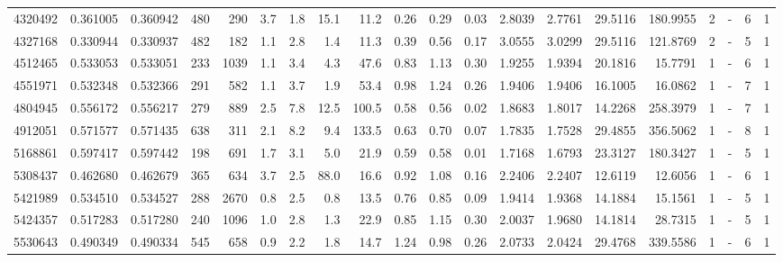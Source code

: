 \begin{center}
\begin{tabular}{rccrrccrrrrrrrrrrlrr}
   4320492 & 0.361005 & 0.360942 &  480 &  290 &      3.7 &      1.8 &    15.1 &    11.2 &   0.26 &   0.29 &       0.03 &  2.8039 &  2.7761 &   29.5116 &  180.9955 &       2 &             - &        6 &         1 \\
   4327168 & 0.330944 & 0.330937 &  482 &  182 &      1.1 &      2.8 &     1.4 &    11.3 &   0.39 &   0.56 &       0.17 &  3.0555 &  3.0299 &   29.5116 &  121.8769 &       2 &             - &        5 &         1 \\
   4512465 & 0.533053 & 0.533051 &  233 & 1039 &      1.1 &      3.4 &     4.3 &    47.6 &   0.83 &   1.13 &       0.30 &  1.9255 &  1.9394 &   20.1816 &   15.7791 &       1 &             - &        6 &         1 \\
   4551971 & 0.532348 & 0.532366 &  291 &  582 &      1.1 &      3.7 &     1.9 &    53.4 &   0.98 &   1.24 &       0.26 &  1.9406 &  1.9406 &   16.1005 &   16.0862 &       1 &             - &        7 &         1 \\
   4804945 & 0.556172 & 0.556217 &  279 &  889 &      2.5 &      7.8 &    12.5 &   100.5 &   0.58 &   0.56 &       0.02 &  1.8683 &  1.8017 &   14.2268 &  258.3979 &       1 &             - &        7 &         1 \\
   4912051 & 0.571577 & 0.571435 &  638 &  311 &      2.1 &      8.2 &     9.4 &   133.5 &   0.63 &   0.70 &       0.07 &  1.7835 &  1.7528 &   29.4855 &  356.5062 &       1 &             - &        8 &         1 \\
   5168861 & 0.597417 & 0.597442 &  198 &  691 &      1.7 &      3.1 &     5.0 &    21.9 &   0.59 &   0.58 &       0.01 &  1.7168 &  1.6793 &   23.3127 &  180.3427 &       1 &             - &        5 &         1 \\
   5308437 & 0.462680 & 0.462679 &  365 &  634 &      3.7 &      2.5 &    88.0 &    16.6 &   0.92 &   1.08 &       0.16 &  2.2406 &  2.2407 &   12.6119 &   12.6056 &       1 &             - &        6 &         1 \\
   5421989 & 0.534510 & 0.534527 &  288 & 2670 &      0.8 &      2.5 &     0.8 &    13.5 &   0.76 &   0.85 &       0.09 &  1.9414 &  1.9368 &   14.1884 &   15.1561 &       1 &             - &        5 &         1 \\
   5424357 & 0.517283 & 0.517280 &  240 & 1096 &      1.0 &      2.8 &     1.3 &    22.9 &   0.85 &   1.15 &       0.30 &  2.0037 &  1.9680 &   14.1814 &   28.7315 &       1 &             - &        5 &         1 \\
   5530643 & 0.490349 & 0.490334 &  545 &  658 &      0.9 &      2.2 &     1.8 &    14.7 &   1.24 &   0.98 &       0.26 &  2.0733 &  2.0424 &   29.4768 &  339.5586 &       1 &             - &        6 &         1 \\

\end{tabular}
\end{center}
